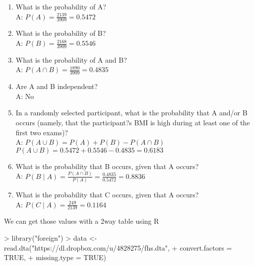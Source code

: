 \documentclass{article}
\begin{document}
\begin{enumerate}
\item What is the probability of A?\\
A: \(P(A)=\frac{2139}{3909}=0.5472\)

\item What is the probability of B?\\
A: \(P(B)=\frac{2168}{3909}=0.5546\)
\item What is the probability of A and B?\\
A: \(P(A \cap B) = \frac{1890}{3909}=0.4835 \)
\item Are A and B independent?\\
A: No
\pagebreak
\item In a randomly selected participant, what is the probability that A and/or B occurs (namely, that the participant?s BMI is high during at least one of the first two exams)?\\
A: \(P(A \cup  B) = P(A)+P(B)- P(A \cap B)\)\\
\(P(A \cup  B) = 0.5472 + 0.5546 - 0.4835 = 0.6183\)

\item What is the probability that B occurs, given that A occurs?\\
A: \(P(B \mid A)=\frac{P(A \cap B)}{P(A)}=\frac{0.4835}{0.5472}=0.8836\)
\item What is the probability that C occurs, given that A occurs?\\
A: \(P(C \mid A)=\frac{249}{2139}=0.1164\)
\end{enumerate}

\pagebreak
We can get those values with a 2way table using R


\begin{Schunk}
\begin{Sinput}
> library("foreign")
> data <- read.dta("https://dl.dropbox.com/u/4828275/fhs.dta",
+                  convert.factors = TRUE,
+                  missing.type = TRUE)
\end{Sinput}
\end{Schunk}
\end{document}
